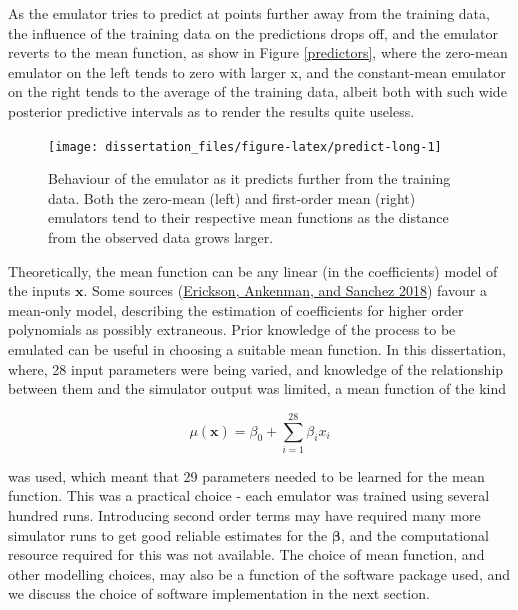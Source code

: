 \documentclass[
  12pt,
  a4paper,
  twoside]{book}
\begin{document}
As the emulator tries to predict at points further away from the training data, the influence of the training data on the predictions drops off, and the emulator reverts to the mean function, as show in Figure \ref{predictors}, where the zero-mean emulator on the left tends to zero with larger x, and the constant-mean emulator on the right tends to the average of the training data, albeit both with such wide posterior predictive intervals as to render the results quite useless.

\begin{figure}[H]

{\centering \texttt{[image: dissertation\_files/figure-latex/predict-long-1]} 

}

\caption{Behaviour of the emulator as it predicts further from the training data. Both the zero-mean (left) and first-order mean (right) emulators tend to their respective mean functions as the distance from the observed data grows larger.}\label{fig:predict-long}
\end{figure}

Theoretically, the mean function can be any linear (in the coefficients) model of the inputs \(\mathbf{x}\). Some sources (\protect\hyperlink{ref-gp_comparison}{Erickson, Ankenman, and Sanchez 2018}) favour a mean-only model, describing the estimation of coefficients for higher order polynomials as possibly extraneous. Prior knowledge of the process to be emulated can be useful in choosing a suitable mean function. In this dissertation, where, 28 input parameters were being varied, and knowledge of the relationship between them and the simulator output was limited, a mean function of the kind

\begin{equation}
\label{eq:simple-mean-function}
\mu(\mathbf{x}) = \beta_0 + \sum_{i=1}^{28} \beta_i x_i
\end{equation}

was used, which meant that 29 parameters needed to be learned for the mean function. This was a practical choice - each emulator was trained using several hundred runs. Introducing second order terms may have required many more simulator runs to get good reliable estimates for the \(\mathbf{\beta}\), and the computational resource required for this was not available.
The choice of mean function, and other modelling choices, may also be a function of the software package used, and we discuss the choice of software implementation in the next section.
\end{document}
